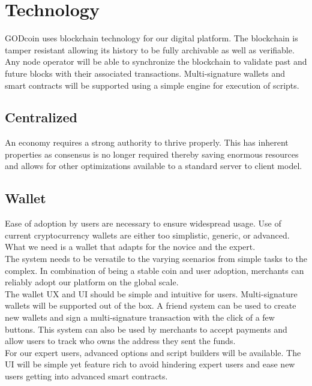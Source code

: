 \documentclass[12pt,a4paper]{article}
\begin{document}
  \section{Technology}
  GODcoin uses blockchain technology for our digital platform. The blockchain is
  tamper resistant allowing its history to be fully archivable as well as
  verifiable. Any node operator will be able to synchronize the blockchain to
  validate past and future blocks with their associated transactions.
  Multi-signature wallets and smart contracts will be supported using a simple
  engine for execution of scripts.\\

  \subsection{Centralized}
  An economy requires a strong authority to thrive properly. This has
  inherent properties as consensus is no longer required thereby saving enormous
  resources and allows for other optimizations available to a standard server to
  client model.

  \subsection{Wallet}
  Ease of adoption by users are necessary to ensure widespread usage. Use of
  current cryptocurrency wallets are either too simplistic, generic, or
  advanced. What we need is a wallet that adapts for the novice and the
  expert.\\

  The system needs to be versatile to the varying scenarios from simple tasks to
  the complex. In combination of being a stable coin and user adoption,
  merchants can reliably adopt our platform on the global scale.\\

  The wallet UX and UI should be simple and intuitive for users. Multi-signature
  wallets will be supported out of the box. A friend system can be used to
  create new wallets and sign a multi-signature transaction with the click of a
  few buttons. This system can also be used by merchants to accept payments and
  allow users to track who owns the address they sent the funds.\\

  For our expert users, advanced options and script builders will be available.
  The UI will be simple yet feature rich to avoid hindering expert users and
  ease new users getting into advanced smart contracts.
\end{document}
